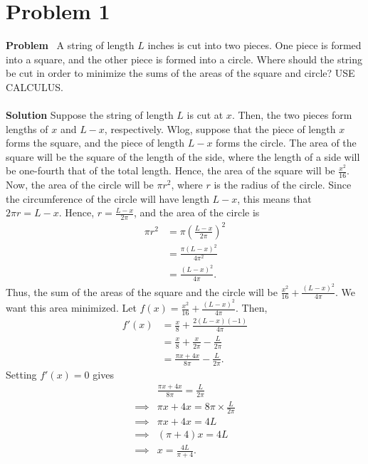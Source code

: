 \section{Problem 1}
\edef\sectionheader{February 16}

\noindent \textbf{Problem} \ A string of length $L$ inches is cut into two pieces. One piece is formed into a square, and the other piece is formed into a circle. Where should the string be cut in order to minimize the sums of the areas of the square and circle? USE CALCULUS.
\\\\
\noindent \textbf{Solution} Suppose the string of length $L$ is cut at $x$. Then, the two pieces form lengths of $x$ and $L-x$, respectively. Wlog, suppose that the piece of length $x$ forms the square, and the piece of length $L-x$ forms the circle. The area of the square will be the square of the length of the side, where the length of a side will be one-fourth that of the total length. Hence, the area of the square will be $\frac{x^2}{16}$. Now, the area of the circle will be $\pi r^2$, where $r$ is the radius of the circle. Since the circumference of the circle will have length $L-x$, this means that $2\pi r = L-x$. Hence, $r = \frac{L-x}{2\pi}$, and the area of the circle is
\begin{align*}
    \pi r^2 & = \pi \left( \frac{L-x}{2\pi} \right)^2 \\
    & = \frac{\pi (L-x)^2}{4\pi^2} \\
    & = \frac{(L-x)^2}{4\pi}.
\end{align*}
Thus, the sum of the areas of the square and the circle will be $\frac{x^2}{16} + \frac{(L-x)^2}{4\pi}$. We want this area minimized. Let $f(x) = \frac{x^2}{16} + \frac{(L-x)^2}{4\pi}$. Then,
\begin{align*}
    f'(x) & = \frac{x}{8} + \frac{2(L-x)(-1)}{4\pi} \\
    & = \frac{x}{8} + \frac{x}{2\pi} - \frac{L}{2\pi} \\
    & = \frac{\pi x + 4x}{8\pi} - \frac{L}{2\pi}.
\end{align*}
Setting $f'(x) = 0$ gives
\begin{align*}
    & \frac{\pi x + 4x}{8\pi} = \frac{L}{2\pi} \\
    \implies & \pi x + 4x = 8\pi \times \frac{L}{2\pi} \\
    \implies & \pi x + 4x = 4L \\
    \implies & (\pi + 4)x = 4L \\
    \implies & x = \frac{4L}{\pi + 4}.
\end{align*}
